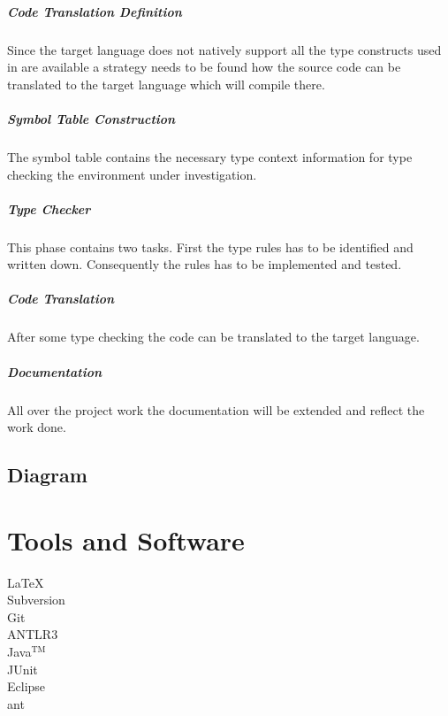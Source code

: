 \paragraph{Code Translation Definition}
Since the target language does not natively support all the type constructs used in \ooplss are available a strategy needs to be found how the source code can be translated to the target language which will compile there.

\paragraph{Symbol Table Construction}
The symbol table contains the necessary type context information for type checking the environment under investigation.

\paragraph{Type Checker}
This phase contains two tasks. First the type rules has to be identified and written down. Consequently the rules has to be implemented and tested.

\paragraph{Code Translation}
After some type checking the code can be translated to the target language.

\paragraph{Documentation}
All over the project work the documentation will be extended and reflect the work done.

\section{Diagram}
\begin{sideways}
	\centering
	
\end{sideways}

\chapter{Tools and Software}
\begin{description}
	\item[\LaTeX] 
	\item[Subversion]
	\item[Git]
	\item[ANTLR3]
	\item[Java$^{\textrm{TM}}$]
	\item[JUnit]
	\item[Eclipse]
	\item[ant]
\end{description}

